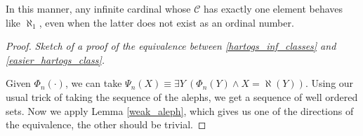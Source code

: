 In this manner, any infinite cardinal whose $\mathcal{C}$ has exactly one element behaves like $\aleph_1$, even when the latter does not exist as an ordinal number.

\begin{proof}
	\emph{Sketch of a proof of the equivalence between \ref{hartogs_inf_classes} and \ref{easier_hartogs_class}.}
	
	Given $\Phi_n (\cdot)$, we can take $\Psi_n (X) \equiv \exists Y \ (\Phi_n (Y) \land X = \aleph(Y))$. Using our usual trick of taking the sequence of the alephs, we get a sequence of well ordered sets. Now we apply Lemma \ref{weak_aleph}, which gives us one of the directions of the equivalence, the other should be trivial.
\end{proof}



\printindex
